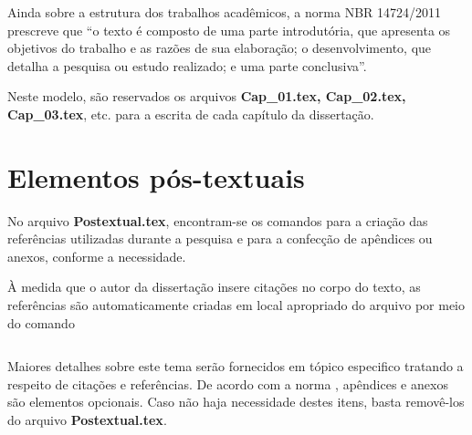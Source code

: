 Ainda sobre a estrutura dos trabalhos acadêmicos, a norma NBR 14724/2011  prescreve que ``o texto é composto de uma parte introdutória, que apresenta os objetivos do trabalho e as razões de sua elaboração; o desenvolvimento, que detalha a pesquisa ou estudo realizado; e uma parte conclusiva''\cite[p.~8]{nbr14724}.

Neste modelo, são reservados os arquivos \textbf{Cap\_01.tex, Cap\_02.tex, Cap\_03.tex}, etc. para a escrita de cada capítulo da dissertação.

\section{Elementos pós-textuais}

No arquivo \textbf{Postextual.tex}, encontram-se os comandos para a criação das referências utilizadas durante a pesquisa e para a confecção de apêndices ou anexos, conforme a necessidade.

À medida que o autor da dissertação insere citações no corpo do texto, as referências são automaticamente criadas em local apropriado do arquivo por meio do comando
\begin{verbatim}

\end{verbatim}

Maiores detalhes sobre este tema serão fornecidos em tópico especifico tratando a respeito de citações e referências. De acordo com a norma , apêndices e anexos são elementos opcionais. Caso não haja necessidade destes itens, basta removê-los do arquivo \textbf{Postextual.tex}.